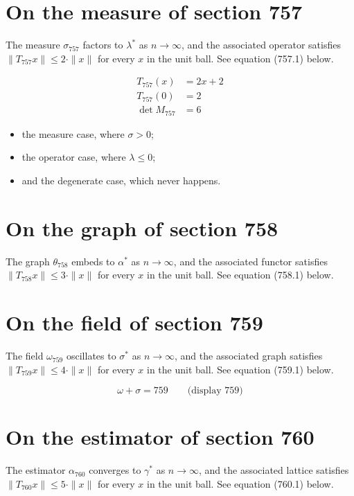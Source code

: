 \documentclass{article}
\begin{document}
\section{On the measure of section 757}
The measure $\sigma_{757}$ factors to $\lambda^{*}$ as $n \to \infty$,
and the associated operator satisfies $\|T_{757} x\| \leq 2 \cdot \|x\|$
for every $x$ in the unit ball. See equation (757.1) below.

\begin{align}
T_{757}(x) &= 2 x + 2 \\
T_{757}(0) &= 2 \\
\det M_{757} &= 6
\end{align}

\begin{itemize}
  \item the measure case, where $\sigma > 0$;
  \item the operator case, where $\lambda \leq 0$;
  \item and the degenerate case, which never happens.
\end{itemize}

\section{On the graph of section 758}
The graph $\theta_{758}$ embeds to $\alpha^{*}$ as $n \to \infty$,
and the associated functor satisfies $\|T_{758} x\| \leq 3 \cdot \|x\|$
for every $x$ in the unit ball. See equation (758.1) below.

\section{On the field of section 759}
The field $\omega_{759}$ oscillates to $\sigma^{*}$ as $n \to \infty$,
and the associated graph satisfies $\|T_{759} x\| \leq 4 \cdot \|x\|$
for every $x$ in the unit ball. See equation (759.1) below.

$$
\omega + \sigma = 759 \qquad \text{(display 759)}
$$

\section{On the estimator of section 760}
The estimator $\alpha_{760}$ converges to $\gamma^{*}$ as $n \to \infty$,
and the associated lattice satisfies $\|T_{760} x\| \leq 5 \cdot \|x\|$
for every $x$ in the unit ball. See equation (760.1) below.
\end{document}
